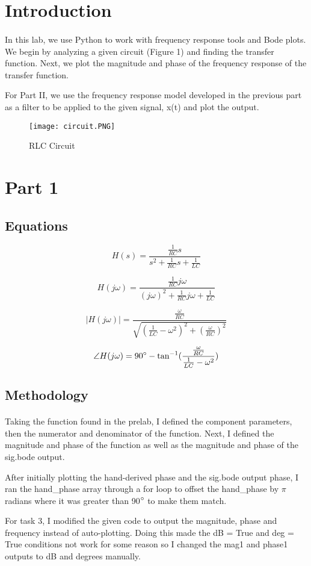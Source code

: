 \tableofcontents

\newpage
\section{Introduction}
\paragraph{}
In this lab, we use Python to work with frequency response tools and Bode plots.  We begin by analyzing a given circuit (Figure 1) and finding the transfer function.  Next, we plot the magnitude and phase of the frequency response of the transfer function.
\par 
For Part II, we use the frequency response model developed in the previous part as a filter to be applied to the given signal, x(t) and plot the output.

\begin{figure}[H]
   	\centering
   	\texttt{[image: circuit.PNG]}
   	\caption{RLC Circuit}
\end{figure}

\section{Part 1}

\subsection{Equations}
\[H(s) = \frac{\frac{1}{RC}s}{s^{2}+\frac{1}{RC}s+\frac{1}{LC}}\]

\[H(j\omega) = \frac{\frac{1}{RC}j\omega}{(j\omega)^{2}+\frac{1}{RC}j\omega+\frac{1}{LC}}\]

\[|H(j\omega)| = \frac{\frac{\omega}{RC}}{\sqrt{(\frac{1}{LC} - \omega^2)^{2} + (\frac{\omega}{RC})^{2}}}\] 

\[\angle H(j\omega) = 90\degree- \tan^{-1}(\frac{\frac{\omega}{RC}}{\frac{1}{LC}-\omega^2}) \]

\subsection{Methodology}
\paragraph{}
Taking the function found in the prelab, I defined the component parameters, then the numerator and denominator of the function.  Next, I defined the magnitude and phase of the function as well as the magnitude and phase of the sig.bode output.
\par 
After initially plotting the hand-derived phase and the sig.bode output phase, I ran the hand\_phase array through a for loop to offset the hand\_phase by $\pi$ radians where it was greater than 90$\degree$ to make them match.
\par 
For task 3, I modified the given code to output the magnitude, phase and frequency instead of auto-plotting.  Doing this made the dB = True and deg = True conditions not work for some reason so I changed the mag1 and phase1 outputs to dB and degrees manually.


